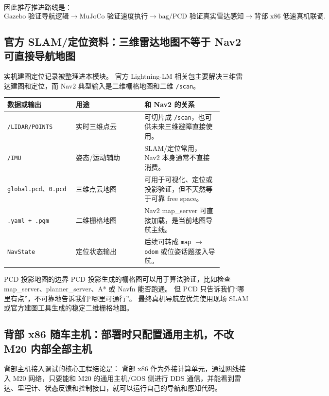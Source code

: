 \documentclass[UTF8,11pt,a4paper]{ctexart}
\begin{document}
因此推荐推进路线是：
\[
\text{Gazebo 验证导航逻辑}
\rightarrow
\text{MuJoCo 验证速度执行}
\rightarrow
\text{bag/PCD 验证真实雷达感知}
\rightarrow
\text{背部 x86 低速真机联调}.
\]

\subsection{官方 SLAM/定位资料：三维雷达地图不等于 Nav2 可直接导航地图}

实机建图定位记录被整理进本模块。
官方 Lightning-LM 相关包主要解决三维雷达建图和定位，而 Nav2 典型输入是二维栅格地图和二维 \texttt{/scan}。

\begin{center}
\renewcommand{\arraystretch}{1.25}
\begin{tabular}{p{0.28\linewidth}p{0.28\linewidth}p{0.32\linewidth}}
\toprule
\textbf{数据或输出} & \textbf{用途} & \textbf{和 Nav2 的关系}\\
\midrule
\texttt{/LIDAR/POINTS} & 实时三维点云 & 可切片成 \texttt{/scan}，也可供未来三维避障直接使用。\\
\texttt{/IMU} & 姿态/运动辅助 & SLAM/定位常用，Nav2 本身通常不直接消费。\\
\texttt{global.pcd}、\texttt{0.pcd} & 三维点云地图 & 可用于可视化、定位或投影验证，但不天然等于可靠 free space。\\
\texttt{.yaml + .pgm} & 二维栅格地图 & Nav2 map\_server 可直接加载，是当前地图导航主线。\\
\texttt{NavState} & 定位状态输出 & 后续可转成 \texttt{map} \(\rightarrow\) \texttt{odom} 或位姿话题接入导航。\\
\bottomrule
\end{tabular}
\end{center}

\begin{orangebox}{PCD 投影地图的边界}
PCD 投影生成的栅格图可以用于算法验证，比如检查 map\_server、planner\_server、A* 或 Navfn 能否跑通。
但 PCD 只告诉我们“哪里有点”，不可靠地告诉我们“哪里可通行”。
最终真机导航应优先使用现场 SLAM 或官方建图工具生成的稳定二维栅格地图。
\end{orangebox}

\subsection{背部 x86 随车主机：部署时只配置通用主机，不改 M20 内部全部主机}

背部主机接入调试的核心工程结论是：
背部 x86 作为外接计算单元，通过网线接入 M20 网络，只要能和 M20 的通用主机/GOS 侧进行 DDS 通信，并能看到雷达、里程计、状态反馈和控制接口，就可以运行自己的导航和感知代码。
\end{document}
